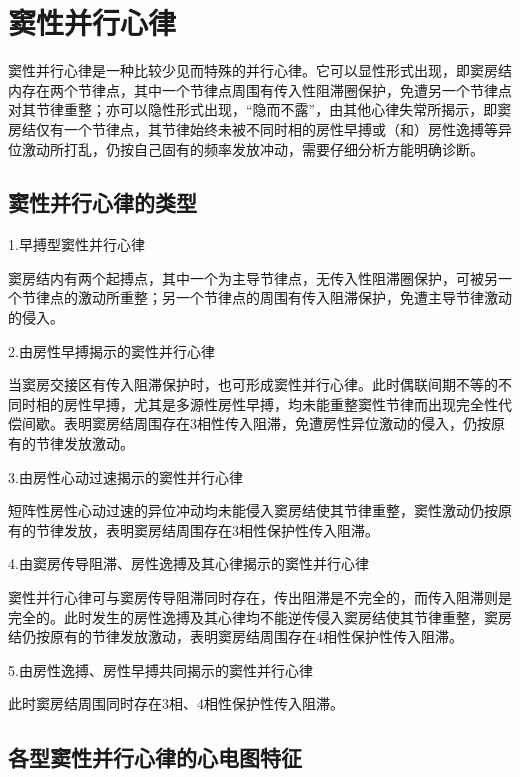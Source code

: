 \protect\hypertarget{text00023.htmlux5cux23subid282}{}{}

\section{窦性并行心律}

窦性并行心律是一种比较少见而特殊的并行心律。它可以显性形式出现，即窦房结内存在两个节律点，其中一个节律点周围有传入性阻滞圈保护，免遭另一个节律点对其节律重整；亦可以隐性形式出现，“隐而不露”，由其他心律失常所揭示，即窦房结仅有一个节律点，其节律始终未被不同时相的房性早搏或（和）房性逸搏等异位激动所打乱，仍按自己固有的频率发放冲动，需要仔细分析方能明确诊断。

\protect\hypertarget{text00023.htmlux5cux23subid283}{}{}

\subsection{窦性并行心律的类型}

1.早搏型窦性并行心律

窦房结内有两个起搏点，其中一个为主导节律点，无传入性阻滞圈保护，可被另一个节律点的激动所重整；另一个节律点的周围有传入阻滞保护，免遭主导节律激动的侵入。

2.由房性早搏揭示的窦性并行心律

当窦房交接区有传入阻滞保护时，也可形成窦性并行心律。此时偶联间期不等的不同时相的房性早搏，尤其是多源性房性早搏，均未能重整窦性节律而出现完全性代偿间歇。表明窦房结周围存在3相性传入阻滞，免遭房性异位激动的侵入，仍按原有的节律发放激动。

3.由房性心动过速揭示的窦性并行心律

短阵性房性心动过速的异位冲动均未能侵入窦房结使其节律重整，窦性激动仍按原有的节律发放，表明窦房结周围存在3相性保护性传入阻滞。

4.由窦房传导阻滞、房性逸搏及其心律揭示的窦性并行心律

窦性并行心律可与窦房传导阻滞同时存在，传出阻滞是不完全的，而传入阻滞则是完全的。此时发生的房性逸搏及其心律均不能逆传侵入窦房结使其节律重整，窦房结仍按原有的节律发放激动，表明窦房结周围存在4相性保护性传入阻滞。

5.由房性逸搏、房性早搏共同揭示的窦性并行心律

此时窦房结周围同时存在3相、4相性保护性传入阻滞。

\protect\hypertarget{text00023.htmlux5cux23subid284}{}{}

\subsection{各型窦性并行心律的心电图特征}

